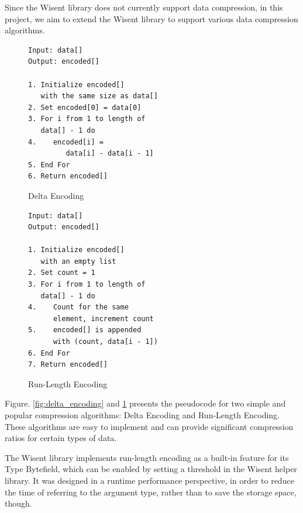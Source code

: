 Since the Wisent library does not currently support data compression, in this project, we aim to extend the Wisent library to support various data compression algorithms.

\begin{figure}[ht]
\centering
\begin{minipage}[t]{0.47\textwidth}
\begin{tcolorbox}[pseudocodebox, title=Algorithm: Delta Encoding]
\begin{verbatim}
Input: data[]
Output: encoded[]

1. Initialize encoded[] 
   with the same size as data[]
2. Set encoded[0] = data[0]
3. For i from 1 to length of 
   data[] - 1 do
4.    encoded[i] = 
         data[i] - data[i - 1]
5. End For
6. Return encoded[]
\end{verbatim}
\end{tcolorbox}
\caption{Delta Encoding}
\label{fig:delta_encoding}
\end{minipage}%
\hfill
\begin{minipage}[t]{0.47\textwidth}
\begin{tcolorbox}[pseudocodebox, title=Algorithm: Run-Length Encoding]
\begin{verbatim}
Input: data[]
Output: encoded[]

1. Initialize encoded[] 
   with an empty list
2. Set count = 1
3. For i from 1 to length of 
   data[] - 1 do
4.    Count for the same 
      element, increment count
5.    encoded[] is appended 
      with (count, data[i - 1])
6. End For
7. Return encoded[]
\end{verbatim}
\end{tcolorbox}
\caption{Run-Length Encoding}
\label{fig:run_length_encoding}
\end{minipage}
\end{figure}

Figure. \ref{fig:delta_encoding} and \ref{fig:run_length_encoding} presents the pseudocode for two simple and popular compression algorithms: Delta Encoding and Run-Length Encoding\cite{gopinath2020comparison}. These algorithms are easy to implement and can provide significant compression ratios for certain types of data. 

The Wisent library implements run-length encoding as a built-in feature for its Type Bytefield, which can be enabled by setting a threshold in the Wisent helper library. It was designed in a runtime performance perspective, in order to reduce the time of referring to the argument type, rather than to save the storage space, though. 

